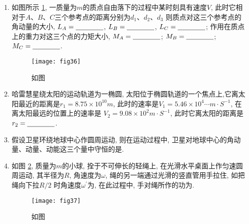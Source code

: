 \begin{enumerate}
    \item 如图所示 \ref{fig:36}, 一质量为$m$的质点自由落下的过程中某时刻具有速度$V$,
    此时它相对于$A$、$B$、$C$三个参考点的距离分别为$d_1、d_2、d_3$
    则质点对这三个参考点的角动量的大小, $L_A=\nl$, 
    $L_B=\nl$, $L_C=\nl$; 作用在质点上的重力对这三个点的力矩大小,
    $M_A=\nl$; $M_B=\nl$; $M_C=\nl$.
    \begin{figure}[H]
        \centering
        \texttt{[image: fig36]}
            \caption{如图}\label{fig:36}
    \end{figure}
    \item 哈雷慧星绕太阳的运动轨道为一椭圆, 太阳位于椭圆轨道的一个焦点上,它离太阳最近的距离是$r_1=8.75\times10^{10}m$, 此时的速率是$V_1=5.46\times10^4\cdots m\cdot S^{-1}$, 在离太阳最远的位置上的速率是
    $V_2=9.08\times 10^2 m·S^{-1}$, 此时它离太阳的距离是$r_2=\nl$.
    \item 假设卫星环绕地球中心作圆周运动, 则在运动过程中, 卫星对地球中心的角动量、动量、动能这三个量中守恒的是\nl .
    \item 如图 \ref{fig:37}, 质量为$m$的小球, 拴于不可伸长的轻绳上, 在光滑水平桌面上作匀速圆周运动, 其半径为$R$, 角速度为$\omega$, 绳的另一端通过光滑的竖直管用手拉住, 如把绳向下拉$R/2$
    时角速度$\omega^{'}$为\nl , 在此过程中, 手对绳所作的功为\nl .
    \begin{figure}[H]
        \centering
        \texttt{[image: fig37]}
            \caption{如图}\label{fig:37}
    \end{figure}
\end{enumerate}
